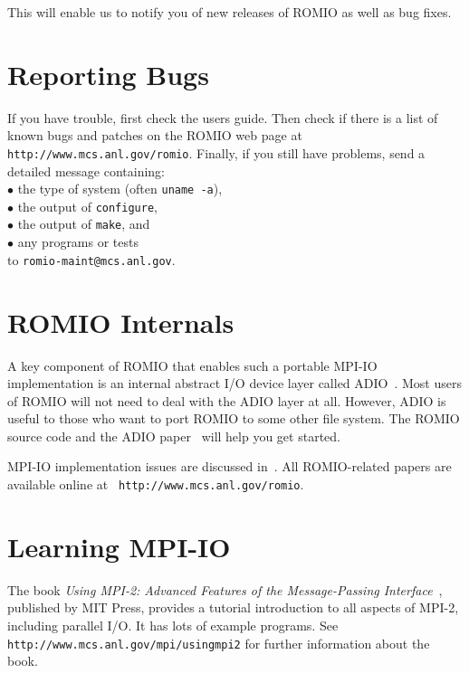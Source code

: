 {\noindent This} will enable us to notify you of new releases of ROMIO
as well as bug fixes.


%
%
\section{Reporting Bugs}
If you have trouble, first check the users guide. Then check if there
is a list of known bugs and patches on the ROMIO web page at {\tt http://www.mcs.anl.gov/romio}.
Finally, if you still have problems, send a detailed message containing:\\
\hspace*{.2in}$\bullet$ the type of system (often {\tt uname -a}),\\
\hspace*{.2in}$\bullet$ the output of {\tt configure},\\
\hspace*{.2in}$\bullet$ the output of {\tt make}, and \\
\hspace*{.2in}$\bullet$ any programs or tests\\
to {\tt romio-maint@mcs.anl.gov}.


%
%
\section{ROMIO Internals}
A key component of ROMIO that enables such a portable MPI-IO
implementation is an internal abstract I/O device layer called
ADIO~\cite{thak96e}. Most users of ROMIO will not need to deal with
the ADIO layer at all. However, ADIO is useful to those who want to
port ROMIO to some other file system. The ROMIO source code and the
ADIO paper~\cite{thak96e} will help you get started.

MPI-IO implementation issues are discussed in~\cite{thak99b}. All
ROMIO-related papers are available online at {\tt
http://www.mcs.anl.gov/romio}.


\section{Learning MPI-IO}
The book {\em Using MPI-2: Advanced Features of the Message-Passing
Interface}~\cite{grop99a}, published by MIT Press, provides a tutorial
introduction to all aspects of MPI-2, including parallel I/O. It has
lots of example programs. See {\tt
http://www.mcs.anl.gov/mpi/usingmpi2} for further information about
the book.

